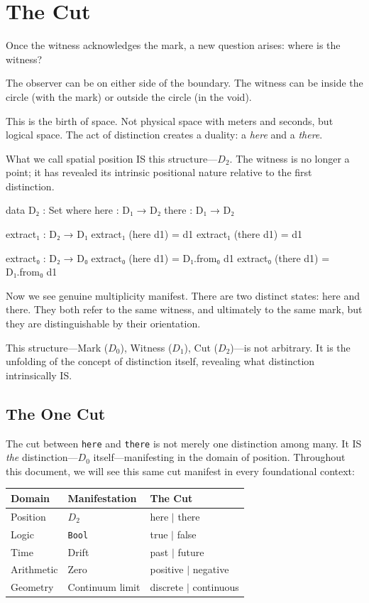 \documentclass[11pt,a4paper]{book}
\begin{document}
\chapter{The Cut}

Once the witness acknowledges the mark, a new question arises: where is the 
witness?

The observer can be on either side of the boundary. 
The witness can be inside the circle (with the mark) or outside the circle 
(in the void).

This is the birth of space. Not physical space with meters and seconds, but 
logical space. The act of distinction creates a duality: a \emph{here} and 
a \emph{there}.

What we call spatial position IS this structure—$D_2$. The witness is no longer 
a point; it has revealed its intrinsic positional nature relative to the first distinction.

\begin{code}
data D₂ : Set where
  here  : D₁ → D₂
  there : D₁ → D₂

extract₁ : D₂ → D₁
extract₁ (here d1)  = d1
extract₁ (there d1) = d1

extract₀ : D₂ → D₀
extract₀ (here d1)  = D₁.from₀ d1
extract₀ (there d1) = D₁.from₀ d1
\end{code}

Now we see genuine multiplicity manifest. There are two distinct states: $\text{here}$ 
and $\text{there}$. They both refer to the same witness, and ultimately to 
the same mark, but they are distinguishable by their orientation.

This structure—Mark ($D_0$), Witness ($D_1$), Cut ($D_2$)—is not 
arbitrary. It is the unfolding of the concept of distinction itself, revealing 
what distinction intrinsically IS.

\section{The One Cut}
\label{sec:unity-of-cut}

The cut between \texttt{here} and \texttt{there} is not merely one distinction among many. 
It IS \emph{the} distinction—$D_0$ itself—manifesting in the domain of position. Throughout 
this document, we will see this same cut manifest in every foundational context:

\begin{center}
\begin{tabular}{lll}
\hline
\textbf{Domain} & \textbf{Manifestation} & \textbf{The Cut} \\
\hline
Position & $D_2$ & here $\mid$ there \\
Logic & \texttt{Bool} & true $\mid$ false \\
Time & Drift & past $\mid$ future \\
Arithmetic & Zero & positive $\mid$ negative \\
Geometry & Continuum limit & discrete $\mid$ continuous \\
\hline
\end{tabular}
\end{center}
\end{document}
